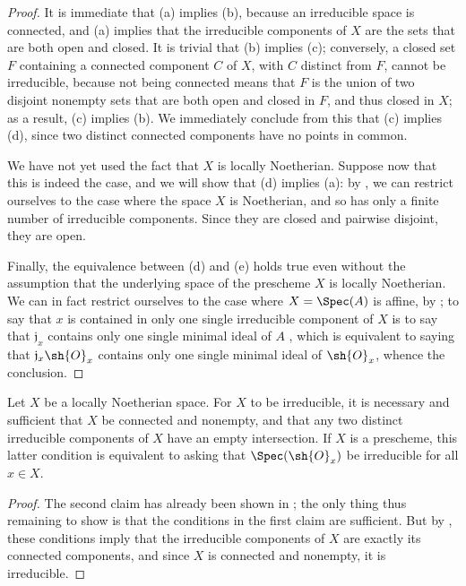 \begin{proof}
It is immediate that (a) implies (b), because an irreducible space is connected, and (a) implies that the irreducible components of $X$ are the sets that are both open and closed.
It is trivial that (b) implies (c); conversely, a closed set $F$ containing
a connected component $C$ of $X$, with $C$ distinct from $F$, cannot be irreducible, because not being connected means that $F$ is the union of two disjoint nonempty sets that are both open and closed in $F$, and thus closed in $X$; as a result, (c) implies (b).
We immediately conclude from this that (c) implies (d), since two distinct connected components have no points in common.

We have not yet used the fact that $X$ is locally Noetherian.
Suppose now that this is indeed the case, and we will show that (d) implies (a): by , we can restrict ourselves to the case where the space $X$ is Noetherian, and so has only a finite number of irreducible components.
Since they are closed and pairwise disjoint, they are open.

Finally, the equivalence between (d) and (e) holds true even without the assumption that the underlying space of the prescheme $X$ is locally Noetherian.
We can in fact restrict ourselves to the case where $X=\Spec(A)$ is affine, by ;
to say that $x$ is contained in only one single irreducible component of $X$ is to say that $\mathfrak{j}_x$ contains only one single minimal ideal of $A$ , which is equivalent to saying that $\mathfrak{j}_x\sh{O}_x$ contains only one single minimal ideal of $\sh{O}_x$, whence the conclusion.
\end{proof}

\begin{corollary}[6.1.11]
\label{I.6.1.11}
Let $X$ be a locally Noetherian space.
For $X$ to be irreducible, it is necessary and sufficient that $X$ be connected and nonempty, and that any two distinct irreducible components of $X$ have an empty intersection.
If $X$ is a prescheme, this latter condition is equivalent to asking that $\Spec(\sh{O}_x)$ be irreducible for all $x\in X$.
\end{corollary}

\begin{proof}
The second claim has already been shown in ;
the only thing thus remaining to show is that the conditions in the first claim are sufficient.
But by , these conditions imply that the irreducible components of $X$ are exactly its connected components, and since $X$ is connected and nonempty, it is irreducible.
\end{proof}

